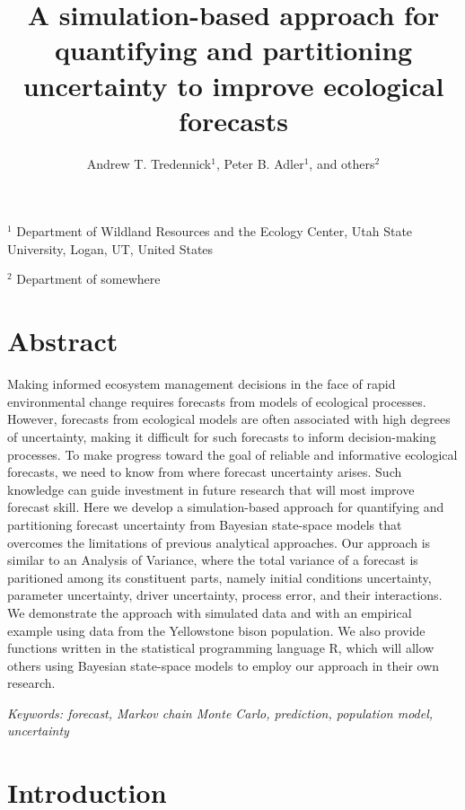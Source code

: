 \documentclass[12pt,]{article}
\title{A simulation-based approach for quantifying and partitioning uncertainty
to improve ecological forecasts}
\author{Andrew T. Tredennick\(^{1}\), Peter B. Adler\(^1\), and others\(^{2}\)}
\date{}
\begin{document}
\maketitle

\setlength{\abovedisplayskip}{0pt}\raggedright

\(^1\) Department of Wildland Resources and the Ecology Center, Utah
State University, Logan, UT, United States

\(^2\) Department of somewhere

\hypertarget{abstract}{%
\section{Abstract}\label{abstract}}

Making informed ecosystem management decisions in the face of rapid
environmental change requires forecasts from models of ecological
processes. However, forecasts from ecological models are often
associated with high degrees of uncertainty, making it difficult for
such forecasts to inform decision-making processes. To make progress
toward the goal of reliable and informative ecological forecasts, we
need to know from where forecast uncertainty arises. Such knowledge can
guide investment in future research that will most improve forecast
skill. Here we develop a simulation-based approach for quantifying and
partitioning forecast uncertainty from Bayesian state-space models that
overcomes the limitations of previous analytical approaches. Our
approach is similar to an Analysis of Variance, where the total variance
of a forecast is paritioned among its constituent parts, namely initial
conditions uncertainty, parameter uncertainty, driver uncertainty,
process error, and their interactions. We demonstrate the approach with
simulated data and with an empirical example using data from the
Yellowstone bison population. We also provide functions written in the
statistical programming language R, which will allow others using
Bayesian state-space models to employ our approach in their own
research.

\emph{Keywords: forecast, Markov chain Monte Carlo, prediction,
population model, uncertainty}

\hypertarget{introduction}{%
\section{Introduction}\label{introduction}}
\end{document}
